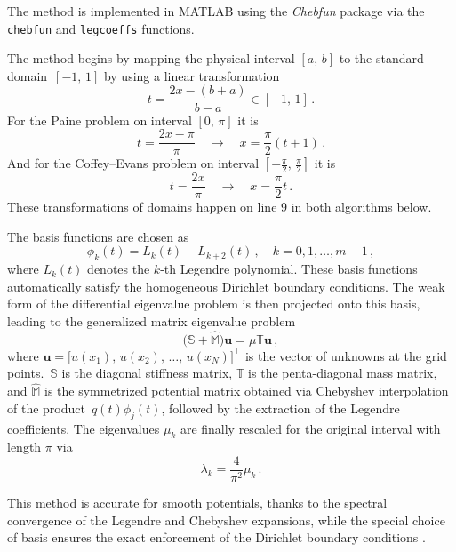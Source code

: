 \documentclass[11pt,a4paper,oneside,openright]{report} %
\begin{document}
The method is implemented in MATLAB using the \textit{Chebfun} package via the \texttt{chebfun} and \texttt{legcoeffs} functions.

The method begins by mapping the physical interval $[a, \, b]$ to the standard domain~$[-1, \, 1]$ by using a linear transformation
\begin{equation}
    t = \dfrac{2x - (b+a)}{b-a} \in [-1, \, 1] \, .
\end{equation}
For the Paine problem on interval $[0, \, \pi]$ it is
\begin{equation}
    t = \dfrac{2x-\pi}{\pi} \quad \to \quad x = \frac{\pi}{2}(t+1) \, .
\end{equation}
And for the Coffey--Evans problem on interval $[-\frac{\pi}{2}, \, \frac{\pi}{2}]$ it is
\begin{equation}
    t = \dfrac{2x}{\pi} \quad \to \quad x = \dfrac{\pi}{2} t \, .
\end{equation}
These transformations of domains happen on line 9 in both algorithms below.

The basis functions are chosen as
\begin{equation}
    \phi_k(t) = L_k(t) - L_{k+2}(t) \, , \quad k = 0,1, \dots, m-1 \, ,
\end{equation}
where $L_k(t)$ denotes the $k$-th Legendre polynomial. These basis functions automatically satisfy the homogeneous Dirichlet boundary conditions. The weak form of the differential eigenvalue problem is then projected onto this basis, leading to the generalized matrix eigenvalue problem
\begin{equation}
    \big(\mathbb{S} + \mathbb{\widehat{M}} \big) \boldsymbol{u} = \mu \mathbb{T} \boldsymbol{u} \, ,
\end{equation}
where $\boldsymbol{u} = \big[u(x_1), \, u(x_2), \, \dots, \, u(x_N) \big]^\top$ is the vector of unknowns at the grid points.~$\mathbb{S}$ is the diagonal stiffness matrix, $\mathbb{T}$ is the penta-diagonal mass matrix, and $\mathbb{\widehat{M}}$ is the symmetrized potential matrix obtained via Chebyshev interpolation of the product~$q(t)\phi_j(t)$, followed by the extraction of the Legendre coefficients. The eigenvalues $\mu_k$ are finally rescaled for the original interval with length $\pi$ via 
\begin{equation}
    \lambda_k = \dfrac{4}{\pi^2} \mu_k \, .
\end{equation}

This method is accurate for smooth potentials, thanks to the spectral convergence of the Legendre and Chebyshev expansions, while the special choice of basis ensures the exact enforcement of the Dirichlet boundary conditions \cite{legendre_galerkin}.
\end{document}
